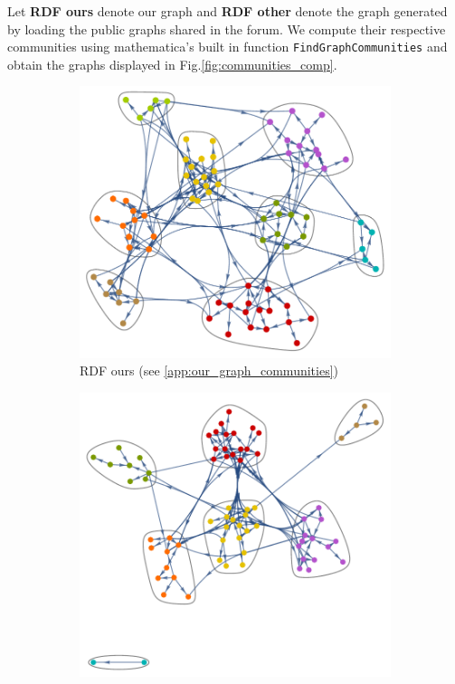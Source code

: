 \documentclass[english, 12pt]{article}
\begin{document}
Let {\bf RDF ours} denote our graph and {\bf RDF other} denote the graph generated by loading the public graphs shared in the forum. We compute their respective communities using mathematica's built in function \texttt{FindGraphCommunities} and obtain the graphs displayed in Fig.\ref{fig:communities_comp}.

\begin{figure}[H]
    \centering
    \begin{subfigure}[b]{0.45\textwidth}
        \centering
        \includegraphics[height=\textwidth]{CommunitiesRDFours.pdf}
        \caption{RDF ours (see \ref{app:our_graph_communities})}
    \end{subfigure}
    \hfill
    \begin{subfigure}[b]{0.45\textwidth}
        \centering
        \includegraphics[height=\textwidth]{CommunitiesRDFother.pdf}

\end{subfigure}
\end{figure}
\end{document}
